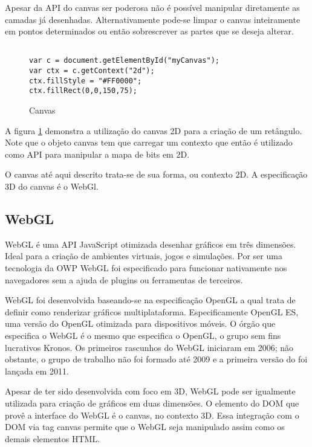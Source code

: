 Apesar da API do canvas ser poderosa não é possível manipular
diretamente as camadas já desenhadas. Alternativamente pode-se limpar
o canvas inteiramente em pontos determinados ou então sobrescrever as
partes que se deseja alterar.

\begin{figure}[H]
\centering
\begin{verbatim}

var c = document.getElementById("myCanvas");
var ctx = c.getContext("2d");
ctx.fillStyle = "#FF0000";
ctx.fillRect(0,0,150,75);

\end{verbatim}
\caption{Canvas}
\label{img:retangleOnCanvas}
\end{figure}

A figura \ref{img:retangleOnCanvas} demonstra a utilização do canvas 2D
para a criação de um retângulo. Note que o objeto canvas tem que carregar um
contexto que então é utilizado como API para manipular a mapa de bits em 2D.

O canvas até aqui descrito trata-se de sua forma, ou contexto 2D. A
especificação 3D do canvas é o WebGl.

\subsection{WebGL}

WebGL é uma API JavaScript otimizada desenhar gráficos em três
dimensões. Ideal para a criação de ambientes virtuais, jogos e
simulações. Por ser uma tecnologia da OWP WebGL foi especificado
para funcionar nativamente nos navegadores sem a ajuda de plugins ou
ferramentas de terceiros.

WebGL foi desenvolvida baseando-se na especificação OpenGL a
qual trata de definir como renderizar gráficos multiplataforma.
Especificamente OpenGL ES, uma versão do OpenGL otimizada para
dispositivos móveis. O órgão que especifica o WebGL é o mesmo que
especifica o OpenGL, o grupo sem fins lucrativos Kronos. Os primeiros
rascunhos do WebGL iniciaram em 2006; não obstante, o grupo de trabalho
não foi formado até 2009 e a primeira versão do foi lançada em 2011.

Apesar de ter sido desenvolvida com foco em 3D, WebGL pode ser
igualmente utilizada para criação de gráficos em duas
dimensões\autocite[p. 6]{3daps}. O elemento do DOM que provê a
interface do WebGL é o canvas, no contexto 3D. Essa integração com
o DOM via tag canvas permite que o WebGL seja manipulado assim como os
demais elementos HTML.


